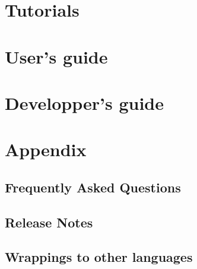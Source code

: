 \documentclass{InsightSoftwareGuide}
\begin{document}




\part{Tutorials}\label{part:tutorials}




\part{User's guide}\label{part:userguide}























\part{Developper's guide}\label{part:developperguide}





\part{Appendix}\label{part:appendix}
\chapter{Frequently Asked Questions}
\label{sec:FrequentlyAskedQuestions}


\chapter{Release Notes}
\label{sec:ReleaseNotes}


\chapter{Wrappings to other languages}
\end{document}
